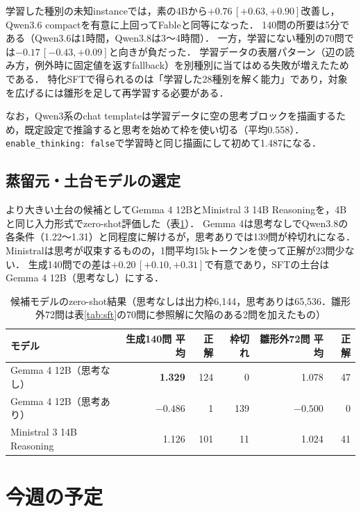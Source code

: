 \documentclass[12pt,a4paper]{article}
\begin{document}
学習した種別の未知instanceでは，素の4Bから$+0.76\,[+0.63, +0.90]$改善し，Qwen3.6 compactを有意に上回ってFableと同等になった．
140問の所要は5分である（Qwen3.6は1時間，Qwen3.8は3〜4時間）．
一方，学習にない種別の70問では$-0.17\,[-0.43, +0.09]$と向きが負だった．
学習データの表層パターン（辺の読み方，例外時に固定値を返すfallback）を別種別に当てはめる失敗が増えたためである．
特化SFTで得られるのは「学習した28種別を解く能力」であり，対象を広げるには雛形を足して再学習する必要がある．

なお，Qwen3系のchat templateは学習データに空の思考ブロックを描画するため，既定設定で推論すると思考を始めて枠を使い切る（平均0.558）．
\texttt{enable\_thinking: false}で学習時と同じ描画にして初めて1.487になる．


\subsection{蒸留元・土台モデルの選定}

より大きい土台の候補としてGemma 4 12BとMinistral 3 14B Reasoningを，4Bと同じ入力形式でzero-shot評価した（表\ref{tab:candidates}）．
Gemma 4は思考なしでQwen3.8の各条件（1.22〜1.31）と同程度に解けるが，思考ありでは139問が枠切れになる．
Ministralは思考が収束するものの，1問平均15kトークンを使って正解が23問少ない．
生成140問での差は$+0.20\,[+0.10, +0.31]$で有意であり，SFTの土台はGemma 4 12B（思考なし）にする．

\begin{table}[H]
  \centering
  \caption{候補モデルのzero-shot結果（思考なしは出力枠6,144，思考ありは65,536．雛形外72問は表\ref{tab:sft}の70問に参照解に欠陥のある2問を加えたもの）}
  \label{tab:candidates}
  \small
  \begin{tabular}{lrrrrr}
    \toprule
    モデル & 生成140問 平均 & 正解 & 枠切れ & 雛形外72問 平均 & 正解 \\
    \midrule
    Gemma 4 12B（思考なし） & \textbf{1.329} & 124 & 0 & 1.078 & 47 \\
    Gemma 4 12B（思考あり） & $-0.486$ & 1 & 139 & $-0.500$ & 0 \\
    Ministral 3 14B Reasoning & 1.126 & 101 & 11 & 1.024 & 41 \\
    \bottomrule
  \end{tabular}
\end{table}


\section{今週の予定}
\end{document}
